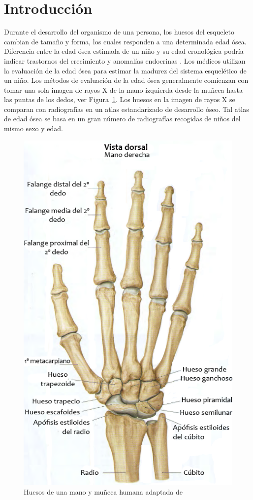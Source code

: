 \documentclass[conference]{IEEEtran}
\begin{document}
\section{Introducción}

Durante el desarrollo del organismo de una persona, los huesos del esqueleto cambian de tamaño y forma, los cuales responden a una determinada edad ósea. Diferencia entre la edad ósea estimada de un niño y su edad cronológica podría indicar trastornos del crecimiento y anomalías endocrinas \cite{AproachToSkeletalMaturation}. Los médicos utilizan la evaluación de la edad ósea para estimar la madurez del sistema esquelético de un niño. Los métodos de evaluación de la edad ósea generalmente comienzan con tomar una sola imagen de rayos X de la mano izquierda desde la muñeca hasta las puntas de los dedos, ver Figura~\ref{fig:mano}. Los huesos en la imagen de rayos X se comparan con radiografías en un atlas estandarizado de desarrollo óseo. Tal atlas de edad ósea se basa en un gran número de radiografías recogidas de niños del mismo sexo y edad.

\begin{figure}[ht!]
  \centering
  \includegraphics[scale=0.7]{misc/imgHuesosMano.png}
  \caption{Huesos de una mano y muñeca humana adaptada de \cite{AtlasMedicina}}
  \label{fig:mano}
\end{figure}
\end{document}
